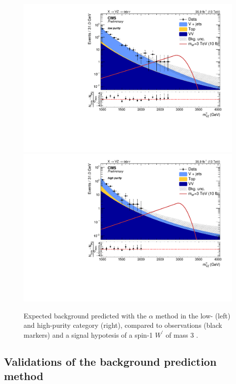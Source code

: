 \begin{figure}[!htb]
  \centering
    \includegraphics[width=.495\textwidth]{figures/XVZnnlp_XWZInv_BkgSR.pdf}
    \includegraphics[width=.495\textwidth]{figures/XVZnnhp_XWZInv_BkgSR.pdf}
  \caption{Expected background predicted with the $\alpha$ method in the low- (left) and high-purity category (right), compared to observations (black markers) and a signal hypotesis of a spin-1 $W^{'}$ of mass 3 \TeV.}
  \label{fig:XVZnn_Exp}
\end{figure}


\subsection{Validations of the background prediction method}
\label{ssec:alpha_validation}


